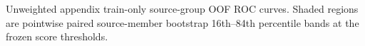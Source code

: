 Unweighted appendix train-only source-group OOF ROC curves. Shaded regions are pointwise paired source-member bootstrap 16th--84th percentile bands at the frozen score thresholds.
